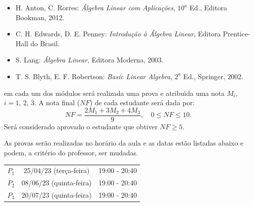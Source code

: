 \documentclass[12pt]{exam}
\begin{document}
\vspace{0.5cm}
\begin{itemize}


    \item H. Anton, C. Rorres: {\it {\'A}lgebra Linear com Aplica\c{c}\~oes}, $10^a$ Ed., Editora Bookman, 2012.

    \item C. H. Edwards, D. E. Penney: {\it Introdu\c{c}\~ao \`a \'Algebra Linear}, Editora Prentice-Hall do Brasil.

    \item S. Lang: {\it \'Algebra Linear}, Editora Moderna, 2003.

    \item T. S. Blyth, E. F. Robertson: {\it Basic Linear Algebra}, $2^a$ Ed., Springer, 2002.
\end{itemize}

 em cada um dos m\'odulos ser\'a realizada uma prova e  atribu{\'\i}da uma nota $M_i$, $i=1$, 2, 3. A nota final ($NF$) de cada estudante ser\'a dada por:
\[
    NF = \dfrac{2M_1 + 3M_2 + 4M_3}{9}, \quad 0 \le NF \le 10.
\]
Ser\'a considerado aprovado o estudante que obtiver $NF \ge 5$.

\vspace{0.5cm}

As provas ser\~ao realizadas no hor\'ario da aula e as datas est\~ao listadas abaixo e podem, a crit\'erio do professor, ser mudadas.

\begin{center}
    \begin{tabular}{c|c|c}
        \hline\hline
        \hspace{1cm}{\bf Prova}\hspace{1cm} & \hspace{3cm}{\bf Data}\hspace{3cm} & \hspace{1.7cm}{\bf Hor\'{a}rio}\hspace{1.7cm} \\
        \hline\hline
        $P_1$ & 25/04/23 (ter\c{c}a-feira) \phantom{x} & 19:00 - 20:40 \\
        \hline
        $P_2$ & 08/06/23 (quinta-feira) \phantom{x} & 19:00 - 20:40 \\
        \hline
        $P_3$ & 20/07/23 (quinta-feira) \phantom{x} & 19:00 - 20:40 \\
        \hline\hline
    \end{tabular}
\end{center}
\end{document}
